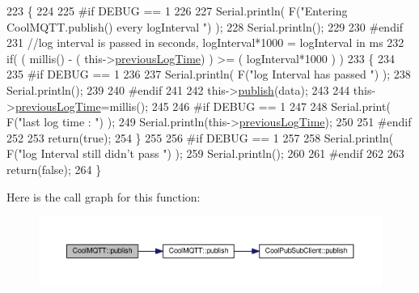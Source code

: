 \begin{DoxyCode}
223 \{
224 
225 \textcolor{preprocessor}{#if DEBUG == 1 }
226 
227     Serial.println( F(\textcolor{stringliteral}{"Entering CoolMQTT.publish() every logInterval "}) );
228     Serial.println();
229 
230 \textcolor{preprocessor}{#endif }
231     \textcolor{comment}{//log interval is passed in seconds, logInterval*1000 = logInterval in ms}
232     \textcolor{keywordflow}{if}( ( millis() - ( this->\hyperlink{class_cool_m_q_t_t_a3db37ef9ed3b05b2a8d44edba0e7d3cc}{previousLogTime})  ) >= ( logInterval*1000 ) )
233     \{
234     
235 \textcolor{preprocessor}{    #if DEBUG == 1}
236 
237         Serial.println( F(\textcolor{stringliteral}{"log Interval has passed "}) );
238         Serial.println();
239     
240 \textcolor{preprocessor}{    #endif}
241 
242         this->\hyperlink{class_cool_m_q_t_t_ace977b3e90ab14b1199fe5c4fb0a13ec}{publish}(data);
243 
244         this->\hyperlink{class_cool_m_q_t_t_a3db37ef9ed3b05b2a8d44edba0e7d3cc}{previousLogTime}=millis();
245     
246 \textcolor{preprocessor}{    #if DEBUG == 1 }
247 
248         Serial.print( F(\textcolor{stringliteral}{"last log time : "}) );
249         Serial.println(this->\hyperlink{class_cool_m_q_t_t_a3db37ef9ed3b05b2a8d44edba0e7d3cc}{previousLogTime});
250 
251 \textcolor{preprocessor}{    #endif}
252 
253         \textcolor{keywordflow}{return}(\textcolor{keyword}{true});
254     \}
255 
256 \textcolor{preprocessor}{#if DEBUG == 1 }
257 
258     Serial.println( F(\textcolor{stringliteral}{"log Interval still didn't pass "}) ); 
259     Serial.println();
260 
261 \textcolor{preprocessor}{#endif}
262 
263     \textcolor{keywordflow}{return}(\textcolor{keyword}{false});
264 \}
\end{DoxyCode}
Here is the call graph for this function\+:\nopagebreak
\begin{figure}[H]
\begin{center}
\leavevmode
\includegraphics[width=350pt]{d0/dd0/class_cool_m_q_t_t_a613c5e3927ae85bb94fbf648d84d8780_cgraph}
\end{center}
\end{figure}
\mbox{\label{class_cool_m_q_t_t_ae3c18f6ae9723746d32765f1c8f176ca}} 
